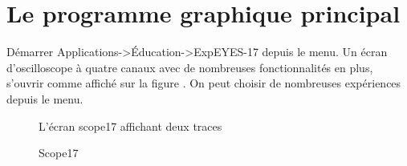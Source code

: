 \documentclass[a4paper,12pt,french]{sphinxmanual}
\begin{document}
\chapter{Le programme graphique principal}
\label{\detokenize{1.4:le-programme-graphique-principal}}\label{\detokenize{1.4::doc}}
Démarrer Applications-\textgreater{}Éducation-\textgreater{}ExpEYES-17 depuis le menu. Un écran
d’oscilloscope à quatre canaux avec de nombreuses fonctionnalités
en plus, s’ouvrir comme affiché sur la figure {\hyperref[\detokenize{1.4:the-scope17-screen}]{}}.
On peut choisir de nombreuses expériences depuis le menu.

\begin{figure}[htbp]
\centering
\capstart

\noindent{}
\caption{Scope17}\label{\detokenize{1.4:id1}}\label{\detokenize{1.4:the-scope17-screen}}
\begin{sphinxlegend}
L’écran scope17 affichant deux traces
\end{sphinxlegend}
\end{figure}
\end{document}
